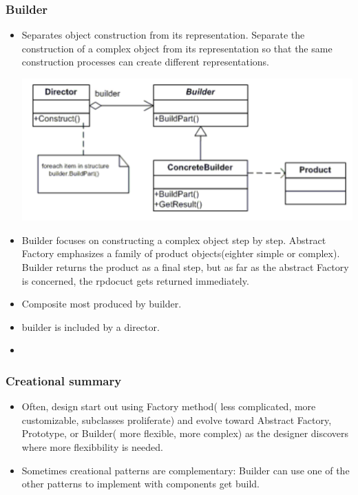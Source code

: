\documentclass[a4paper,12pt,twoside]{book}
\begin{document}
\subsubsection{Builder}
\begin{itemize}
\item Separates object construction from its representation. Separate the construction of a complex object from its representation so that the same construction processes can create different representations.

\includegraphics[scale=0.75]{pics/builder.png}

\item Builder focuses on constructing a complex object step by step. Abstract Factory emphasizes a family of product objects(eighter simple or complex). Builder returns the product as a final step, but as far as the abstract Factory is concerned, the rpdocuct gets returned immediately. 

\item Composite most produced by builder. 
\item builder is included by a director. 

\item 
\end{itemize}

\subsubsection{Creational summary} 
\begin{itemize}
\item Often, design start out using Factory method( less complicated, more customizable, subclasses proliferate) and evolve toward Abstract Factory, Prototype, or Builder( more flexible, more complex) as the designer discovers where more flexibbility is needed. 
\item Sometimes creational patterns are complementary: Builder can use one of the other patterns to implement with components get build. 
\end{itemize}
\end{document}
